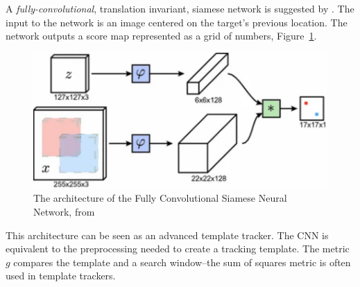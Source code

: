   A \textit{fully-convolutional}, translation invariant, siamese network is suggested by \citeauthor{bertinetto2016}.
  The input to the network is an image centered on the target's previous location.
  The network outputs a score map represented as a grid of numbers, Figure~\ref{fig:convSiamese}.

  \begin{figure}[!ht]
    \centering
    \includegraphics[scale = 0.6]{convSiamese.pdf}
    \caption{The architecture of the Fully Convolutional Siamese Neural Network, from \protect\cite{bertinetto2016}}
    \label{fig:convSiamese}
  \end{figure}

  This architecture can be seen as an advanced template tracker.
  The CNN is equivalent to the preprocessing needed to create a tracking template.
  The metric $g$ compares the template and a search window--the sum of squares metric is often used in template trackers.

